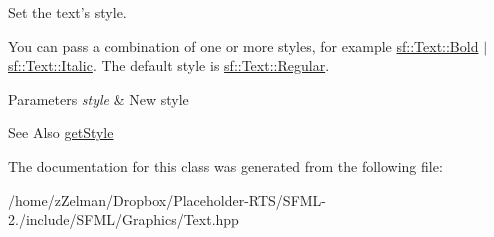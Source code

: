 Set the text's style. 

You can pass a combination of one or more styles, for example \hyperlink{classsf_1_1Text_aa8add4aef484c6e6b20faff07452bd82af1b47f98fb1e10509ba930a596987171}{sf\-::\-Text\-::\-Bold} $|$ \hyperlink{classsf_1_1Text_aa8add4aef484c6e6b20faff07452bd82aee249eb803848723c542c2062ebe69d8}{sf\-::\-Text\-::\-Italic}. The default style is \hyperlink{classsf_1_1Text_aa8add4aef484c6e6b20faff07452bd82a2af9ae5e1cda126570f744448e0caa32}{sf\-::\-Text\-::\-Regular}.


\begin{DoxyParams}{Parameters}
{\em style} & New style\\
\hline
\end{DoxyParams}
\begin{DoxySeeAlso}{See Also}
\hyperlink{classsf_1_1Text_a3f7483a48faf66378da19d36ff6145cf}{get\-Style} 
\end{DoxySeeAlso}


The documentation for this class was generated from the following file\-:\begin{DoxyCompactItemize}
\item 
/home/z\-Zelman/\-Dropbox/\-Placeholder-\/\-R\-T\-S/\-S\-F\-M\-L-\/2./include/\-S\-F\-M\-L/\-Graphics/Text.\-hpp\end{DoxyCompactItemize}
